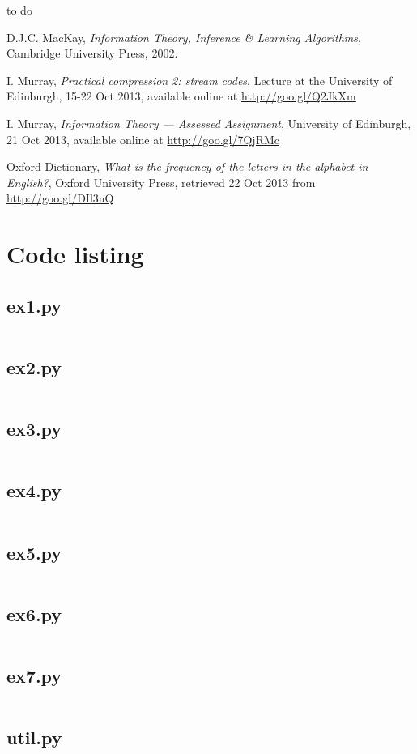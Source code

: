 \documentclass[10pt,a4paper,oneside,onecolumn]{article}
\begin{document}
to do %


\begin{thebibliography}{9}

    D.J.C. MacKay,
    \emph{Information Theory, Inference \& Learning Algorithms},
    Cambridge University Press,
    2002.

    I. Murray,
    \emph{Practical compression 2: stream codes},
    Lecture at the University of Edinburgh,
    15-22 Oct 2013,
    available online at \url{http://goo.gl/Q2JkXm}

    I. Murray,
    \emph{Information Theory — Assessed Assignment},
    University of Edinburgh,
    21 Oct 2013,
    available online at \url{http://goo.gl/7QjRMc}

    Oxford Dictionary,
    \emph{What is the frequency of the letters in the alphabet in English?},
    Oxford University Press,
    retrieved 22 Oct 2013 from \url{http://goo.gl/DIl3uQ}

\end{thebibliography}


\onecolumn
\appendixpage
\appendix

\section{Code listing}

\subsection{ex1.py}\label{app:ex1}
\inputminted{python}{../src/ex1.py}

\subsection{ex2.py}\label{app:ex2}
\inputminted{python}{../src/ex2.py}

\subsection{ex3.py}\label{app:ex3}
\inputminted{python}{../src/ex3.py}

\subsection{ex4.py}\label{app:ex4}
\inputminted{python}{../src/ex4.py}

\subsection{ex5.py}\label{app:ex5}
\inputminted{python}{../src/ex5.py}

\subsection{ex6.py}\label{app:ex6}
\inputminted{python}{../src/ex6.py}

\subsection{ex7.py}\label{app:ex7}
\inputminted{python}{../src/ex7.py}

\subsection{util.py}\label{app:util}
\inputminted{python}{../src/util.py}
\end{document}
